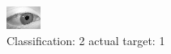 \begin{figure}[h!]
\begin{center}
\includegraphics[width=0.60\columnwidth]{figures/ID2778_class_2_target_1.png}
\end{center}
\caption{ Classification: 2 actual target: 1}
\label{fig:ID2778_class_2_target_1}
\end{figure}
